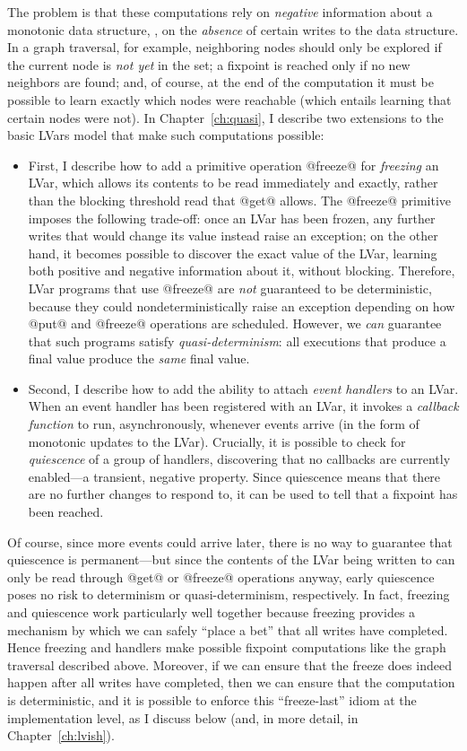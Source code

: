 The problem is that these computations rely on \emph{negative}
information about a monotonic data structure, \ie, on the
\emph{absence} of certain writes to the data structure.  In a graph
traversal, for example, neighboring nodes should only be explored if
the current node is \emph{not yet} in the set; a fixpoint is reached
only if no new neighbors are found; and, of course, at the end of the
computation it must be possible to learn exactly which nodes were
reachable (which entails learning that certain nodes were not).  In
Chapter~\ref{ch:quasi}, I describe two extensions to the basic LVars
model that make such computations possible:
\begin{itemize}
\item First, I describe how to add a primitive operation @freeze@ for
  \emph{freezing} an LVar, which allows its contents to be read
  immediately and exactly, rather than the blocking threshold read
  that @get@ allows.  The @freeze@ primitive imposes the following
  trade-off: once an LVar has been frozen, any further writes that
  would change its value instead raise an exception; on the other
  hand, it becomes possible to discover the exact value of the LVar,
  learning both positive and negative information about it, without
  blocking.  Therefore, LVar programs that use @freeze@ are \emph{not}
  guaranteed to be deterministic, because they could
  nondeterministically raise an exception depending on how @put@ and
  @freeze@ operations are scheduled.  However, we \emph{can} guarantee
  that such programs satisfy \emph{quasi-determinism}: all executions
  that produce a final value produce the \emph{same} final value.
\item Second, I describe how to add the ability to attach \emph{event
  handlers} to an LVar.  When an event handler has been registered
  with an LVar, it invokes a \emph{callback function} to run,
  asynchronously, whenever events arrive (in the form of monotonic
  updates to the LVar).  Crucially, it is possible to check for
  \emph{quiescence} of a group of handlers, discovering that no
  callbacks are currently enabled---a transient, negative property.
  Since quiescence means that there are no further changes to respond
  to, it can be used to tell that a fixpoint has been reached.
\end{itemize}
Of course, since more events could arrive later, there is no way to
guarantee that quiescence is permanent---but since the contents of the
LVar being written to can only be read through @get@ or @freeze@
operations anyway, early quiescence poses no risk to determinism or
quasi-determinism, respectively.  In fact, freezing and quiescence
work particularly well together because freezing provides a mechanism
by which we can safely ``place a bet'' that all writes have completed.
Hence freezing and handlers make possible fixpoint computations like
the graph traversal described above.  Moreover, if we can ensure that
the freeze does indeed happen after all writes have completed, then we
can ensure that the computation is deterministic, and it is possible
to enforce this ``freeze-last'' idiom at the implementation level, as
I discuss below (and, in more detail, in
Chapter~\ref{ch:lvish}).


